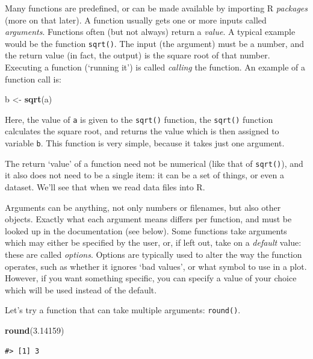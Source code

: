 \documentclass[]{book}
\newenvironment{Shaded}{\begin{snugshade}}{\end{snugshade}}
\newcommand{\KeywordTok}[1]{\textcolor[rgb]{0.13,0.29,0.53}{\textbf{{#1}}}}
\newcommand{\FloatTok}[1]{\textcolor[rgb]{0.00,0.00,0.81}{{#1}}}
\newcommand{\StringTok}[1]{\textcolor[rgb]{0.31,0.60,0.02}{{#1}}}
\newcommand{\NormalTok}[1]{{#1}}
\theoremstyle{definition}
\theoremstyle{definition}
\theoremstyle{remark}
\begin{document}
Many functions are predefined, or can be made available by importing R
\emph{packages} (more on that later). A function usually gets one or
more inputs called \emph{arguments}. Functions often (but not always)
return a \emph{value}. A typical example would be the function
\texttt{sqrt()}. The input (the argument) must be a number, and the
return value (in fact, the output) is the square root of that number.
Executing a function (`running it') is called \emph{calling} the
function. An example of a function call is:

\begin{Shaded}
\begin{Highlighting}[]
\NormalTok{b <-}\StringTok{ }\KeywordTok{sqrt}\NormalTok{(a)}
\end{Highlighting}
\end{Shaded}

Here, the value of \texttt{a} is given to the \texttt{sqrt()} function,
the \texttt{sqrt()} function calculates the square root, and returns the
value which is then assigned to variable \texttt{b}. This function is
very simple, because it takes just one argument.

The return `value' of a function need not be numerical (like that of
\texttt{sqrt()}), and it also does not need to be a single item: it can
be a set of things, or even a dataset. We'll see that when we read data
files into R.

Arguments can be anything, not only numbers or filenames, but also other
objects. Exactly what each argument means differs per function, and must
be looked up in the documentation (see below). Some functions take
arguments which may either be specified by the user, or, if left out,
take on a \emph{default} value: these are called \emph{options}. Options
are typically used to alter the way the function operates, such as
whether it ignores `bad values', or what symbol to use in a plot.
However, if you want something specific, you can specify a value of your
choice which will be used instead of the default.

Let's try a function that can take multiple arguments: \texttt{round()}.

\begin{Shaded}
\begin{Highlighting}[]
\KeywordTok{round}\NormalTok{(}\FloatTok{3.14159}\NormalTok{)}
\end{Highlighting}
\end{Shaded}

\begin{verbatim}
#> [1] 3
\end{verbatim}
\end{document}
